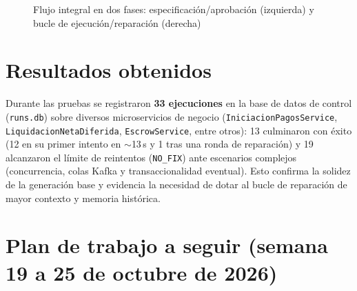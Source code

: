 \documentclass[11pt,a4paper]{article}
\begin{document}
\begin{figure}[htbp]
\caption{Flujo integral en dos fases: especificación/aprobación (izquierda) y bucle de ejecución/reparación (derecha)}
\end{figure}

\section{Resultados obtenidos}

Durante las pruebas se registraron \textbf{33 ejecuciones} en la base de datos de control (\texttt{runs.db}) sobre diversos microservicios de negocio (\texttt{IniciacionPagosService}, \texttt{LiquidacionNetaDiferida}, \texttt{EscrowService}, entre otros): 13 culminaron con éxito (12 en su primer intento en $\sim$13\,s y 1 tras una ronda de reparación) y 19 alcanzaron el límite de reintentos (\texttt{NO\_FIX}) ante escenarios complejos (concurrencia, colas Kafka y transaccionalidad eventual). Esto confirma la solidez de la generación base y evidencia la necesidad de dotar al bucle de reparación de mayor contexto y memoria histórica.

\section{Plan de trabajo a seguir (semana 19 a 25 de octubre de 2026)}
\end{document}
